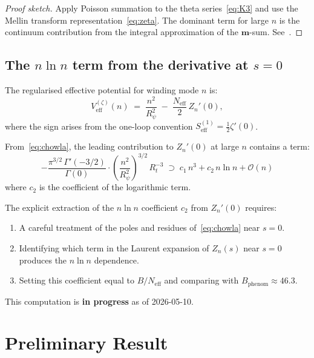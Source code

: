 \documentclass[12pt,a4paper]{article}
\theoremstyle{definition}
\theoremstyle{remark}
\newcommand{\calO}{\mathcal{O}}
\begin{document}
\begin{proof}[Proof sketch]
Apply Poisson summation to the theta series~\eqref{eq:K3} and use the
Mellin transform representation~\eqref{eq:zeta}.  The dominant term for
large $n$ is the continuum contribution from the integral approximation of
the $\mathbf{m}$-sum.  See~\cite{chowla_selberg}.
\end{proof}

\subsection{The $n\ln n$ term from the derivative at $s=0$}

The regularised effective potential for winding mode $n$ is:
\begin{equation}
\label{eq:veff_zeta}
  V_{\mathrm{eff}}^{(\zeta)}(n)
  \;=\;
  \frac{n^2}{R_\psi^2}
  \;-\;
  \frac{N_{\mathrm{eff}}}{2}\,Z_n'(0),
\end{equation}
where the sign arises from the one-loop convention $S_{\mathrm{eff}}^{(1)} = \frac{1}{2}\zeta'(0)$.

From~\eqref{eq:chowla}, the leading contribution to $Z_n'(0)$ at large $n$
contains a term:
\[
  -\frac{\pi^{3/2}\,\Gamma'(-3/2)}{\Gamma(0)}
  \cdot \left(\frac{n^2}{R_\psi^2}\right)^{3/2}\,R_t^{-3}
  \;\supset\;
  c_1\,n^3 + c_2\,n\ln n + \calO(n)
\]
where $c_2$ is the coefficient of the logarithmic term.

\begin{tcolorbox}[colback=yellow!5!white,colframe=orange!60!black,
  title={Key computation needed for Path B}]
The explicit extraction of the $n\ln n$ coefficient $c_2$ from
$Z_n'(0)$ requires:
\begin{enumerate}
  \item A careful treatment of the poles and residues of~\eqref{eq:chowla}
        near $s = 0$.
  \item Identifying which term in the Laurent expansion of $Z_n(s)$ near
        $s = 0$ produces the $n\ln n$ dependence.
  \item Setting this coefficient equal to $B/N_{\mathrm{eff}}$ and comparing
        with $B_{\mathrm{phenom}} \approx 46.3$.
\end{enumerate}

This computation is \textbf{in progress} as of 2026-05-10.
\end{tcolorbox}

\section{Preliminary Result}
\label{sec:prelim}
\end{document}
